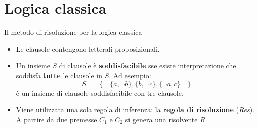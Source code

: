 \documentclass{beamer}
\begin{document}
\section{Logica classica}
\begin{frame}{Il metodo di risoluzione per la logica classica}
    \begin{itemize}
        \item Le clausole contengono letterali proposizionali.
        \vspace{10px}
        \item Un insieme $S$ di clausole è \textbf{soddisfacibile} sse esiste interpretazione che soddisfa \textbf{tutte} le clausole in $S$.
        Ad esempio:
        \[S \; = \; \{ \quad \{a, \lnot b\}, \{b, \lnot c\}, \{\lnot a, c\} \quad \}\]
        è un insieme di clausole soddisfacibile con tre clausole.
        \vspace{10px}
        \item Viene utilizzata una sola regola di inferenza: la \textbf{regola di risoluzione} (\emph{Res}). A partire da due premesse $C_1$ e $C_2$ si genera una risolvente $R$.
    \end{itemize}
\end{frame}
\end{document}
